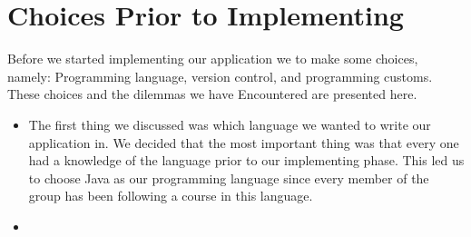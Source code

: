 \chapter{Choices Prior to Implementing}
Before we started implementing our application we to make some choices, namely: Programming language, version control, and programming customs.
These choices and the dilemmas we have Encountered are presented here.

\begin{itemize}
	\item The first thing we discussed was which language we wanted to write our application in.
We decided that the most important thing was that every one had a knowledge of the language prior to our implementing phase.
This led us to choose Java as our programming language since every member of the group has been following a course in this language.

	\item 
\end{itemize}


